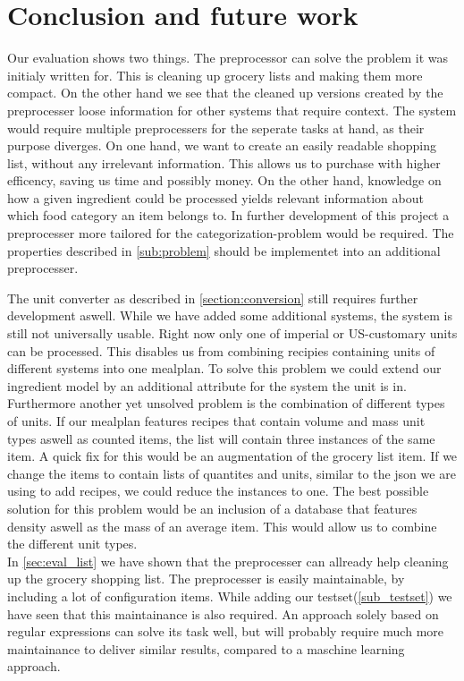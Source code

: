 
\chapter{Conclusion and future work}\label{chapter:conc_future_work}
Our evaluation shows two things. The preprocessor can solve the problem it was initialy written for. This is cleaning up grocery lists and making them more compact.
On the other hand we see that the cleaned up versions created by the preprocesser loose information for other systems that require context. The system would require multiple preprocessers for the seperate tasks at hand, as their purpose diverges.
On one hand, we want to create an easily readable shopping list, without any irrelevant information. This allows us to purchase with higher efficency, saving us time and possibly money. On the other hand, knowledge on how a given ingredient could be processed yields relevant information about which food category an item belongs to. In further development of  this project a preprocesser more tailored for the categorization-problem would be required. The properties described in \ref{sub:problem} should be implementet into an additional preprocesser.

The unit converter as described in \ref{section:conversion} still requires further development aswell. While we have added some additional systems, the system is still not universally usable. Right now only one of imperial or US-customary units can be processed. This disables us from combining recipies containing units of different systems into one mealplan. To solve this problem we could extend our ingredient model by an additional attribute for the system the unit is in. Furthermore another yet unsolved problem is the combination of different types of units. If our mealplan features recipes that contain volume and mass unit types aswell as counted items, the list will contain three instances of the same item. A quick fix for this would be an augmentation of the grocery list item. If we change the items to contain lists of quantites and units, similar to the json we are using to add recipes, we could reduce the instances to one. The best possible solution for this problem would be an inclusion of a database that features density aswell as the mass of an average item. This would allow us to combine the different unit types.\\

In \ref{sec:eval_list} we have shown that the preprocesser can allready help cleaning up the grocery shopping list. The preprocesser is easily maintainable, by including a lot of configuration items. While adding our testset(\ref{sub_testset}) we have seen that this maintainance is also required. An approach solely based on regular expressions can solve its task well, but will probably require much more maintainance to deliver similar results, compared to a maschine learning approach.

